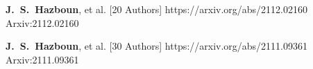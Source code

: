          {\textbf{J.~S.~{Hazboun}}, et al. [20 Authors]}
         {https://arxiv.org/abs/2112.02160}
         {{Arxiv:}2112.02160}

         {\textbf{J.~S.~{Hazboun}}, et al. [30 Authors]}
         {https://arxiv.org/abs/2111.09361}
         {{Arxiv:}2111.09361}

